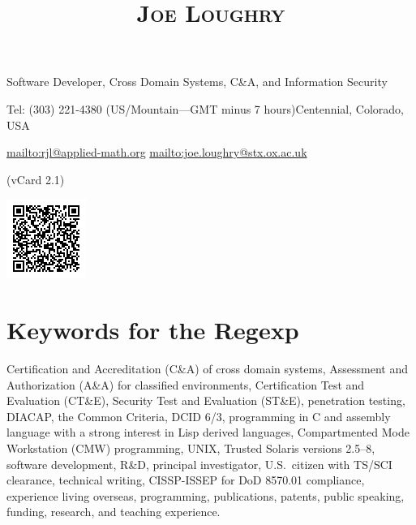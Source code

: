 \documentclass[letterpaper]{article}
\date{}
\title{\textsc{Joe Loughry}}
\author{}
\begin{document}
\maketitle

\vspace{-23mm}

\begin{minipage}[b]{0.827\textwidth}
{\large Software Developer, Cross Domain Systems, C\&A, and Information Security}

\vspace{2mm}
Tel: (303) 221-4380 (US/Mountain---GMT minus 7 hours)\hfill Centennial, Colorado, USA

\url{mailto:rjl@applied-math.org} \hfill \url{mailto:joe.loughry@stx.ox.ac.uk}

\vspace{6mm}
\hfill {\scriptsize (vCard 2.1)}
\end{minipage}
\begin{minipage}{0.8in}\vspace{-21.5mm}
\includegraphics[scale=0.85]{J_Loughry_vCard_QR_med.png}
\end{minipage}

\vspace{-12.5mm}
\section*{Keywords for the Regexp}

Certification and Accreditation (C\&A) of cross domain systems,
Assessment and Authorization (A\&A) for classified environments,
Certification Test and Evaluation (CT\&E),
Security Test and Evaluation (ST\&E),
penetration testing,
DIACAP,
the Common Criteria,
DCID 6/3,
programming in C and assembly language with a strong interest in Lisp derived languages,
Compartmented Mode Workstation (CMW) programming,
UNIX,
Trusted Solaris versions 2.5--8,
software development,
R\&D,
principal investigator,
U.S.\ citizen with TS/SCI clearance,
technical writing,
CISSP-ISSEP for DoD 8570.01 compliance,
experience living overseas,
programming,
publications,
patents,
public speaking,
funding,
research,
and teaching experience.

\vspace{-3mm}
\end{document}
